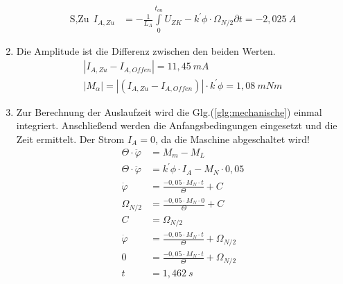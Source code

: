 \begin{solution}
\begin{enumerate}
\begin{align}
\text{S,Zu}~~ I_{A,Zu}&=- \frac{1}{L_A}\int \limits_{0}^{t_{on}} U_{ZK} -k^{'} \phi \cdot \Omega_{N/2} \partial t=-2,025~A
\end{align}
\item Die Amplitude ist die Differenz zwischen den beiden Werten.
\begin{align}
|I_{A,Zu}- I_{A,Offen}|=11,45~mA\\
|M_\alpha| = |(I_{A,Zu}- I_{A,Offen})| \cdot k^{'} \phi = 1,08~mNm
\end{align}
\item Zur Berechnung der Auslaufzeit wird die Glg.(\ref{glg:mechanische}) einmal integriert. Anschließend werden die Anfangsbedingungen eingesetzt und die Zeit ermittelt. Der Strom $I_A =0$, da die Maschine abgeschaltet wird!
\begin{align}
\Theta \cdot \ddot{\varphi} &= M_m - M_L\\
\Theta \cdot \ddot{\varphi} &= k^{'} \phi \cdot I_A - M_N \cdot 0,05\\
\dot{\varphi} &= \frac{-0,05 \cdot M_N \cdot t}{\Theta}+ C\\
\Omega_{N/2} &= \frac{-0,05 \cdot M_N \cdot 0}{\Theta}+ C\\
C&= \Omega_{N/2}\\
\dot{\varphi} &= \frac{-0,05 \cdot M_N \cdot t}{\Theta}+ \Omega_{N/2}\\
0 &= \frac{-0,05 \cdot M_N \cdot t}{\Theta}+ \Omega_{N/2}\\
t &= 1,462~s
\end{align}
\end{enumerate}
\end{solution}